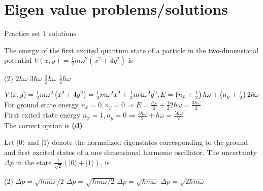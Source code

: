 \chapter{Eigen value problems/solutions}
\begin{abox}
	Practice set 1 solutions
	\end{abox}
\begin{enumerate}
	\begin{minipage}{\textwidth}
	\item The energy of the first excited quantum state of a particle in the two-dimensional potential $V(x, y)=\frac{1}{2} m \omega^{2}\left(x^{2}+4 y^{2}\right)$ is
\end{minipage}
\begin{tasks}(2)
	\task[\textbf{A.}] $2 \hbar \omega$
	\task[\textbf{B.}]$3 \hbar \omega$
	\task[\textbf{C.}]$\frac{3}{2} \hbar \omega$
	\task[\textbf{D.}] $\frac{5}{2} \hbar \omega$
\end{tasks}
\begin{answer}
	$V(x, y)=\frac{1}{2} m \omega^{2}\left(x^{2}+4 y^{2}\right)=\frac{1}{2} m \omega^{2} x^{2}+\frac{1}{2} m 4 \omega^{2} y^{2}, \\
	E=\left(n_{x}+\frac{1}{2}\right) \hbar \omega+\left(n_{y}+\frac{1}{2}\right) 2 \hbar \omega$\\
	For ground state energy $n_{x}=0, n_{y}=0 \Rightarrow E=\frac{\hbar \omega}{2}+\frac{1}{2} 2 \hbar \omega=\frac{3 \hbar \omega}{2}$\\
	First exited state energy $n_{x}=1, n_{y}=0 \Rightarrow \frac{3 \hbar \omega}{2}+\hbar \omega=\frac{5 \hbar \omega}{2}$\\
	The correct option is \textbf{(d)}
\end{answer}
\begin{minipage}{\textwidth}
	\item Let $|0\rangle$ and $|1\rangle$ denote the normalized eigenstates corresponding to the ground and first excited states of a one dimensional harmonic oscillator. The uncertainty $\Delta p$ in the state $\frac{1}{\sqrt{2}}(|0\rangle+|1\rangle)$, is
\end{minipage}
\begin{tasks}(2)
	\task[\textbf{A.}] $\Delta p=\sqrt{\hbar m \omega} / 2$
	\task[\textbf{B.}]$\Delta p=\sqrt{\hbar m \omega / 2}$
	\task[\textbf{C.}]$\Delta p=\sqrt{\hbar m \omega}$
	\task[\textbf{D.}]$\Delta p=\sqrt{2 \hbar m \omega}$
\end{tasks}
\begin{answer}

\end{answer}
\end{enumerate}
